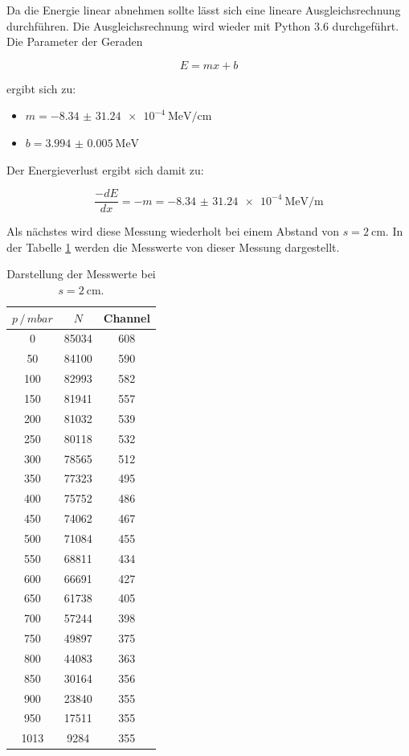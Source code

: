 Da die Energie linear abnehmen sollte lässt sich eine lineare Ausgleichsrechnung
durchführen. Die Ausgleichsrechnung wird wieder mit Python 3.6 durchgeführt.
Die Parameter der Geraden

\begin{equation*}
  E = mx + b
\end{equation*}

ergibt sich zu:

\begin{itemize}
  \item $m = \SI{-8.34(3124)e-4}{\mega\eV\per\centi\meter}$
  \item $b = \SI{3.994(5)}{\mega\eV}$
\end{itemize}

Der Energieverlust ergibt sich damit zu:

\begin{equation*}
  \frac{-dE}{dx} = -m = \SI{-8.34(3124)e-4}{\mega\eV\per\meter}
\end{equation*}

Als nächstes wird diese Messung wiederholt bei einem Abstand von $s = \SI{2}{\centi\meter}$.
In der Tabelle \ref{tab:2} werden die Messwerte von dieser Messung dargestellt.

\begin{table}[H]
  \centering
  \caption{Darstellung der Messwerte bei $s = \SI{2}{\centi\meter}$.}
  \label{tab:2}
  \begin{tabular}{c c c}
    \toprule
    $p \, / \, mbar$ & $N$ & Channel \\
    \midrule
    0  & 85034& 608 \\
    50 & 84100& 590 \\
    100& 82993& 582 \\
    150& 81941& 557 \\
    200& 81032& 539 \\
    250& 80118& 532 \\
    300& 78565& 512 \\
    350& 77323& 495 \\
    400& 75752& 486 \\
    450& 74062& 467 \\
    500& 71084& 455 \\
    550& 68811& 434 \\
    600& 66691& 427 \\
    650& 61738& 405 \\
    700& 57244& 398 \\
    750& 49897& 375 \\
    800& 44083& 363 \\
    850& 30164& 356 \\
    900& 23840& 355 \\
    950& 17511& 355 \\
   1013 &  9284& 355 \\
    \bottomrule
  \end{tabular}
\end{table}

